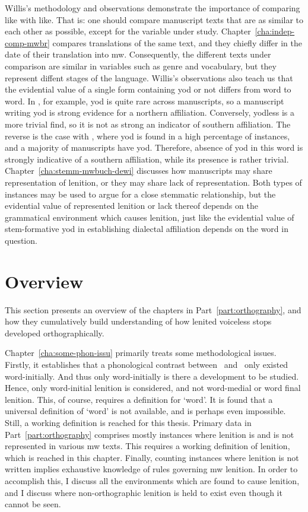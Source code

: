 Willis's methodology and observations demonstrate the importance of comparing like with like. That is: one should compare manuscript texts that are as similar to each other as possible, except for the variable under study. Chapter~\ref{cha:indep-comp-mwbr} compares translations of the same text, and they chiefly differ in the date of their translation into \gls{mw}. Consequently, the different texts under comparison are similar in variables such as genre and vocabulary, but they represent diffent stages of the language. Willis's observations also teach us that the evidential value of a single form containing yod or not differs from word to word. In , for example, yod is quite rare across manuscripts, so a manuscript writing yod is strong evidence for a northern affiliation. Conversely, yodless  is a more trivial find, so it is not as strong an indicator of southern affiliation. The reverse is the case with , where yod is found in a high percentage of instances, and a majority of manuscripts have yod. Therefore, absence of yod in this word is strongly indicative of a southern affiliation, while its presence is rather trivial. Chapter~\ref{cha:stemm-mwbuch-dewi} discusses how manuscripts may share representation of lenition, or they may share lack of representation. Both types of  instances may be used to argue for a close stemmatic relationship, but the evidential value of represented lenition or lack thereof depends on the grammatical environment which causes lenition, just like the evidential value of stem-formative yod in establishing dialectal affiliation depends on the word in question.

\section{Overview}
\label{sec:overview}

This section presents an overview of the chapters in Part~\ref{part:orthography}, and how they  cumulatively build understanding of how lenited voiceless stops developed orthographically.

Chapter~\ref{cha:some-phon-issu} primarily treats some methodological issues. Firstly, it establishes that a phonological contrast between \lT\ and \xD\ only existed word-initially. And thus only word-initially is there a development to be studied. Hence, only word-initial lenition is considered, and not word-medial or word final lenition. This, of course, requires a definition for `word'. It is found that a universal definition of `word' is not available, and is perhaps even impossible. Still, a working definition is reached for this thesis. Primary data in Part~\ref{part:orthography} comprises mostly instances where lenition is and is not represented in various \gls{mw} texts. This requires a working definition of lenition, which is reached in this chapter. Finally, counting instances where lenition is not written implies exhaustive knowledge of rules governing \gls{mw} lenition. In order to accomplish this, I discuss all the environments which are found to cause lenition, and I discuss where non-orthographic lenition is held to exist even though it cannot be seen.


